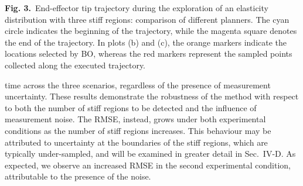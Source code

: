 \documentclass[11pt]{article}
\begin{document}
\begin{center}
\end{center}

\vspace{0.4em}

\textbf{Fig. 3.}\ End-effector tip trajectory during the exploration
of an elasticity distribution with three stiff regions: comparison of
different planners. The cyan circle indicates the beginning of the
trajectory, while the magenta square denotes the end of the
trajectory. In plots (b) and (c), the orange markers indicate the
locations selected by BO, whereas the red markers represent the
sampled points collected along the executed trajectory.

\vspace{0.8em}

time across the three scenarios, regardless of the presence of
measurement uncertainty. These results demonstrate the robustness of
the method with respect to both the number of stiff regions to be
detected and the influence of measurement noise. The RMSE, instead,
grows under both experimental conditions as the number of stiff
regions increases. This behaviour may be attributed to uncertainty
at the boundaries of the stiff regions, which are typically
under-sampled, and will be examined in greater detail in Sec.~IV-D.
As expected, we observe an increased RMSE in the second experimental
condition, attributable to the presence of the noise.
\end{document}
